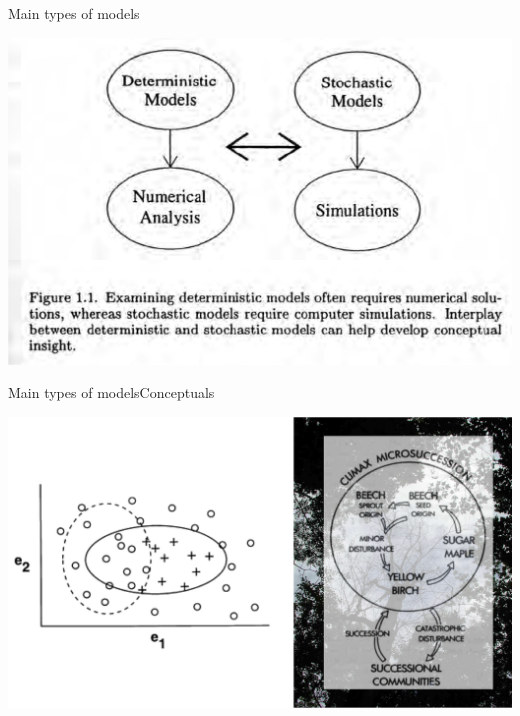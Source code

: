 \documentclass{eecslides}
\begin{document}
	\begin{frame}{Main types of models}

		\begin{center}
			\includegraphics[height=0.75\textheight]{wilson_models}
		\end{center}

	\end{frame}


	\begin{frame}{Main types of models}{Conceptuals}

		\begin{center}
			\includegraphics[height=0.65\textheight]{conceptual_model}
		\end{center}

	\end{frame}

\end{document}
